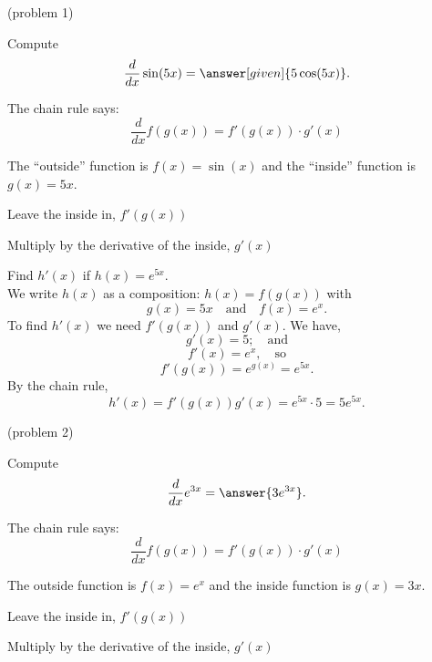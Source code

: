 \documentclass{ximera}
\begin{document}
\begin{problem}(problem 1)
  
Compute
  \[
  \frac{d}{dx} \sin(5x) = \answer[given]{5\cos(5x)}.
  \]
    \begin{hint}
      The chain rule says:
      \[
      \frac{d}{dx} f(g(x)) = f'(g(x))\cdot g'(x)
      \]
    \end{hint}
    \begin{hint}
      The ``outside'' function is $f(x) = \sin(x)$ and the ``inside''
      function is $g(x) = 5x$.
    \end{hint}
    \begin{hint}
		  Leave the inside in, $f'(g(x))$
		\end{hint}
		\begin{hint}
		  Multiply by the derivative of the inside, $g'(x)$
		\end{hint}
	 
\end{problem}



\begin{example}[example 2]

Find $h'(x)$ if $h(x) = e^{5x}$.\\
We write $h(x)$ as a composition: $h(x)=f(g(x))$ with
\[
g(x) = 5x  \quad \text{and} \quad f(x) = e^x.
\]
To find $h'(x)$ we need $f'(g(x))$ and $g'(x)$. We have,
\[
g'(x) = 5; \quad \text{and} 
\]
\[
f'(x) = e^x, \quad \text{so}
\]
\[
f'(g(x)) =e^{g(x)} = e^{5x}.
\]
By the chain rule,
\[
h'(x) = f'(g(x))g'(x) = e^{5x} \cdot 5 = 5e^{5x}.
\]

\end{example}


\begin{center}
\begin{foldable}
\end{foldable}
\end{center}



\begin{problem}(problem 2)
  
Compute
  \[
  \frac{d}{dx} e^{3x} = \answer{3e^{3x}}.
  \]
  
    \begin{hint}
      The chain rule says:
      \[
      \frac{d}{dx} f(g(x)) = f'(g(x))\cdot g'(x)
      \]
    \end{hint}
    \begin{hint}
      The outside function is $f(x) = e^x$ and the inside
      function is $g(x) = 3x$.
    \end{hint}
    \begin{hint}
		  Leave the inside in, $f'(g(x))$
		\end{hint}
		\begin{hint}
		  Multiply by the derivative of the inside, $g'(x)$
		\end{hint}
    
\end{problem}
\end{document}
